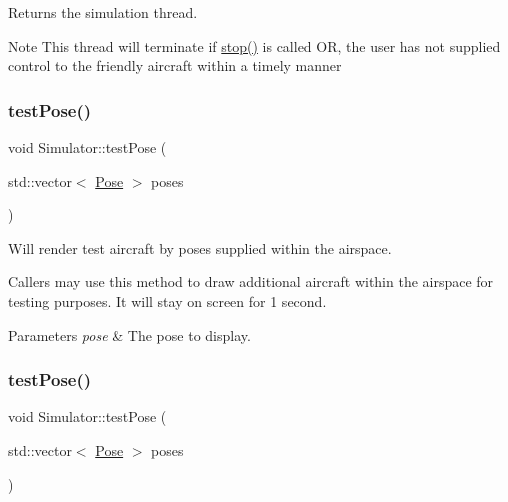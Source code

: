 Returns the simulation thread. 

\begin{DoxyNote}{Note}
This thread will terminate if {\ttfamily \hyperlink{classSimulator_ae88ecc16eb03836e8b4a355836d7500b}{stop()}} is called OR, the user has not supplied control to the friendly aircraft within a timely manner 
\end{DoxyNote}
\mbox{\label{classSimulator_aedf306bfd80a13ff07d9197bd5703805}} 
\subsubsection{\texorpdfstring{test\+Pose()}{testPose()}\hspace{0.1cm}{\footnotesize\ttfamily [1/2]}}
{\footnotesize\ttfamily void Simulator\+::test\+Pose (\begin{DoxyParamCaption}\item[{std\+::vector$<$ \hyperlink{structPose}{Pose} $>$}]{poses }\end{DoxyParamCaption})}



Will render test aircraft by poses supplied within the airspace. 

Callers may use this method to draw additional aircraft within the airspace for testing purposes. It will stay on screen for 1 second.


\begin{DoxyParams}{Parameters}
{\em pose} & The pose to display. \\
\hline
\end{DoxyParams}
\mbox{\label{classSimulator_aedf306bfd80a13ff07d9197bd5703805}} 
\subsubsection{\texorpdfstring{test\+Pose()}{testPose()}\hspace{0.1cm}{\footnotesize\ttfamily [2/2]}}
{\footnotesize\ttfamily void Simulator\+::test\+Pose (\begin{DoxyParamCaption}\item[{std\+::vector$<$ \hyperlink{structPose}{Pose} $>$}]{poses }\end{DoxyParamCaption})}



